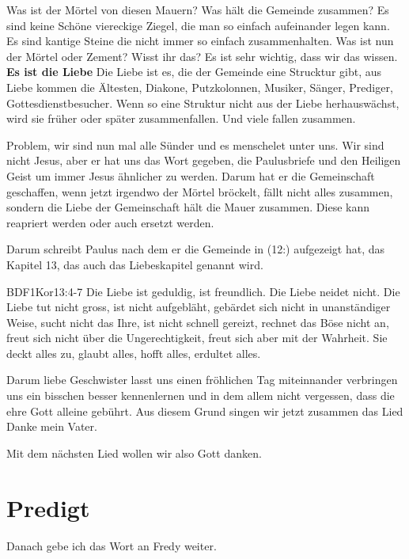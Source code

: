 \documentclass{../../inc/mybib}
\begin{document}
\begin{spacing}{1.5}
Was ist der Mörtel von diesen Mauern? Was hält die Gemeinde zusammen? Es sind keine Schöne viereckige Ziegel, die man so einfach aufeinander legen kann. Es sind kantige Steine die nicht immer so einfach zusammenhalten. Was ist nun der Mörtel oder Zement? Wisst ihr das? Es ist sehr wichtig, dass wir das wissen. \textbf{Es ist die Liebe} Die Liebe ist es, die der Gemeinde eine Strucktur gibt, aus Liebe kommen die Ältesten, Diakone, Putzkolonnen, Musiker, Sänger, Prediger, Gottesdienstbesucher. Wenn so eine Struktur nicht aus der Liebe herhauswächst, wird sie früher oder später zusammenfallen. Und viele fallen zusammen.

Problem, wir sind nun mal alle Sünder und es menschelet unter uns. Wir sind nicht Jesus, aber er hat uns das Wort gegeben, die Paulusbriefe und den Heiligen Geist um immer Jesus ähnlicher zu werden. Darum hat er die Gemeinschaft geschaffen, wenn jetzt irgendwo der Mörtel bröckelt, fällt nicht alles zusammen, sondern die Liebe der Gemeinschaft hält die Mauer zusammen. Diese kann reapriert werden oder auch ersetzt werden.

Darum schreibt Paulus nach dem er die Gemeinde in (12:) aufgezeigt hat, das Kapitel 13, das auch das Liebeskapitel genannt wird.

\begin{bibelbox}{BDF}{1Kor}{13:4-7}
Die Liebe ist geduldig, ist freundlich. Die Liebe neidet nicht. Die Liebe tut nicht gross, ist nicht aufgebläht, gebärdet sich nicht in unanständiger Weise, sucht nicht das Ihre, ist nicht schnell gereizt, rechnet das Böse nicht an, freut sich nicht über die Ungerechtigkeit, freut sich aber mit der Wahrheit. Sie deckt alles zu, glaubt alles, hofft alles, erdultet alles.
\end{bibelbox}

Darum liebe Geschwister lasst uns einen fröhlichen Tag miteinnander verbringen uns ein bisschen besser kennenlernen und in dem allem nicht vergessen, dass die ehre Gott alleine gebührt. Aus diesem Grund singen wir jetzt zusammen das Lied Danke mein Vater.

Mit dem nächsten Lied wollen wir also Gott danken.
\end{spacing}

\section{Predigt}

Danach gebe ich das Wort an Fredy weiter.
\end{document}
